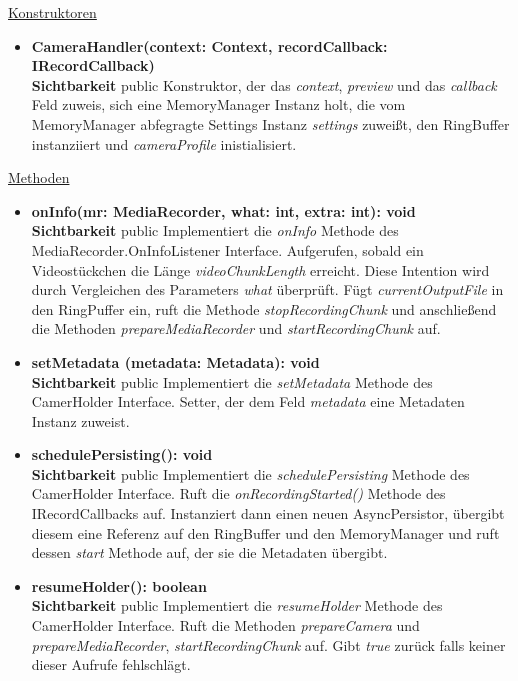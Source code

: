\underline{Konstruktoren}
\begin{itemize}
\itemsep0pt
\item \textbf{CameraHandler(context: Context, recordCallback: IRecordCallback)} \hfill\\
\textbf{Sichtbarkeit} public\newline
Konstruktor, der das \textit{context}, \textit{preview} und das \textit{callback} Feld zuweis, sich eine MemoryManager Instanz holt, die vom MemoryManager abfegragte Settings Instanz \textit{settings} zuweißt, den RingBuffer instanziiert und \textit{cameraProfile} inistialisiert.
\end{itemize}

\underline{Methoden}
\begin{itemize}
\itemsep0pt
\item \textbf{onInfo(mr: MediaRecorder, what: int, extra: int): void}\hfill\\
\textbf{Sichtbarkeit} public\newline
Implementiert die \textit{onInfo} Methode des MediaRecorder.OnInfoListener Interface. Aufgerufen, sobald ein Videostückchen die Länge \textit{videoChunkLength} erreicht. Diese Intention wird durch Vergleichen des Parameters \textit{what} überprüft. Fügt \textit{currentOutputFile} in den RingPuffer ein, ruft die Methode \textit{stopRecordingChunk} und anschließend die Methoden \textit{prepareMediaRecorder} und \textit{startRecordingChunk} auf.

\item \textbf{setMetadata (metadata: Metadata): void}\hfill\\
\textbf{Sichtbarkeit} public\newline
Implementiert die \textit{setMetadata} Methode des CamerHolder Interface. Setter, der dem Feld \textit{metadata} eine Metadaten Instanz zuweist.

\item \textbf{schedulePersisting(): void}\hfill\\
\textbf{Sichtbarkeit} public\newline
Implementiert die \textit{schedulePersisting} Methode des CamerHolder Interface. Ruft die \textit{onRecordingStarted()} Methode des IRecordCallbacks auf. Instanziert dann einen neuen AsyncPersistor, übergibt diesem eine Referenz auf den RingBuffer und den MemoryManager und ruft dessen \textit{start} Methode auf, der sie die Metadaten übergibt.

\item \textbf{resumeHolder(): boolean}\hfill\\
\textbf{Sichtbarkeit} public\newline
Implementiert die \textit{resumeHolder} Methode des CamerHolder Interface. Ruft die Methoden \textit{prepareCamera} und \textit{prepareMediaRecorder}, \textit{startRecordingChunk} auf. Gibt \textit{true} zurück falls keiner dieser Aufrufe fehlschlägt.


\end{itemize}
